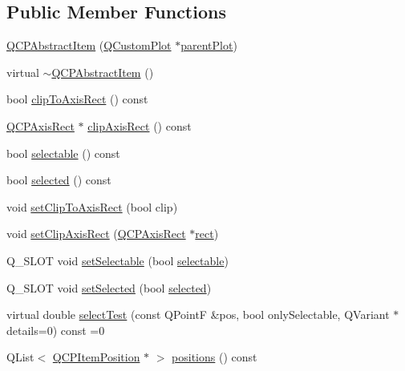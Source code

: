 \subsection*{Public Member Functions}
\begin{DoxyCompactItemize}
\item 
\hyperlink{class_q_c_p_abstract_item_a9922507d8b4503a1fe1ed0b1030e23b6}{Q\+C\+P\+Abstract\+Item} (\hyperlink{class_q_custom_plot}{Q\+Custom\+Plot} $\ast$\hyperlink{class_q_c_p_layerable_ab7e0e94461566093d36ffc0f5312b109}{parent\+Plot})
\item 
virtual \hyperlink{class_q_c_p_abstract_item_a375bd1b7d3218b04a6ff7ff06fff917c}{$\sim$\+Q\+C\+P\+Abstract\+Item} ()
\item 
bool \hyperlink{class_q_c_p_abstract_item_a5b0ea171823033bcb8aee81f4a034871}{clip\+To\+Axis\+Rect} () const 
\item 
\hyperlink{class_q_c_p_axis_rect}{Q\+C\+P\+Axis\+Rect} $\ast$ \hyperlink{class_q_c_p_abstract_item_a37f86618740b5047eae23eedb2de061a}{clip\+Axis\+Rect} () const 
\item 
bool \hyperlink{class_q_c_p_abstract_item_a9189e752025533e1595eaade0009a3bc}{selectable} () const 
\item 
bool \hyperlink{class_q_c_p_abstract_item_a225865808640d8d9a7dd19f09a2e93f2}{selected} () const 
\item 
void \hyperlink{class_q_c_p_abstract_item_a39e05b9d4176b9accafc746d16ca6a06}{set\+Clip\+To\+Axis\+Rect} (bool clip)
\item 
void \hyperlink{class_q_c_p_abstract_item_a7dc75fcbcd10206fe0b75d757ea7a347}{set\+Clip\+Axis\+Rect} (\hyperlink{class_q_c_p_axis_rect}{Q\+C\+P\+Axis\+Rect} $\ast$\hyperlink{_gen_blob_8m_aea8f6815d9a63491fc422c5572c6b3c3}{rect})
\item 
Q\+\_\+\+S\+L\+O\+T void \hyperlink{class_q_c_p_abstract_item_a8a8e32a55bc478b849756a78c2d87fd2}{set\+Selectable} (bool \hyperlink{class_q_c_p_abstract_item_a9189e752025533e1595eaade0009a3bc}{selectable})
\item 
Q\+\_\+\+S\+L\+O\+T void \hyperlink{class_q_c_p_abstract_item_a203de94ad586cc44d16c9565f49d3378}{set\+Selected} (bool \hyperlink{class_q_c_p_abstract_item_a225865808640d8d9a7dd19f09a2e93f2}{selected})
\item 
virtual double \hyperlink{class_q_c_p_abstract_item_a96d522d10ffc0413b9a366c6f7f0476b}{select\+Test} (const Q\+Point\+F \&pos, bool only\+Selectable, Q\+Variant $\ast$details=0) const =0
\item 
Q\+List$<$ \hyperlink{class_q_c_p_item_position}{Q\+C\+P\+Item\+Position} $\ast$ $>$ \hyperlink{class_q_c_p_abstract_item_adf6a680cc29a6bce8345c3b6af3a91a1}{positions} () const 

\end{DoxyCompactItemize}
